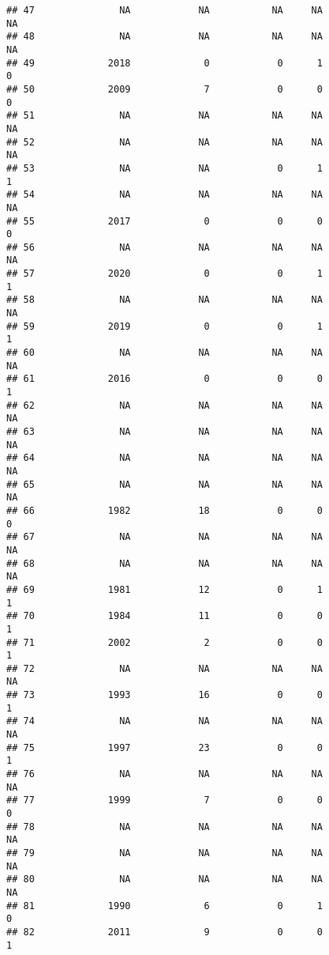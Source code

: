 \documentclass[
  english,
  man]{apa6}
\begin{document}
\begin{verbatim}
## 47               NA            NA           NA     NA              NA
## 48               NA            NA           NA     NA              NA
## 49             2018             0            0      1               0
## 50             2009             7            0      0               0
## 51               NA            NA           NA     NA              NA
## 52               NA            NA           NA     NA              NA
## 53               NA            NA            0      1               1
## 54               NA            NA           NA     NA              NA
## 55             2017             0            0      0               0
## 56               NA            NA           NA     NA              NA
## 57             2020             0            0      1               1
## 58               NA            NA           NA     NA              NA
## 59             2019             0            0      1               1
## 60               NA            NA           NA     NA              NA
## 61             2016             0            0      0               1
## 62               NA            NA           NA     NA              NA
## 63               NA            NA           NA     NA              NA
## 64               NA            NA           NA     NA              NA
## 65               NA            NA           NA     NA              NA
## 66             1982            18            0      0               0
## 67               NA            NA           NA     NA              NA
## 68               NA            NA           NA     NA              NA
## 69             1981            12            0      1               1
## 70             1984            11            0      0               1
## 71             2002             2            0      0               1
## 72               NA            NA           NA     NA              NA
## 73             1993            16            0      0               1
## 74               NA            NA           NA     NA              NA
## 75             1997            23            0      0               1
## 76               NA            NA           NA     NA              NA
## 77             1999             7            0      0               0
## 78               NA            NA           NA     NA              NA
## 79               NA            NA           NA     NA              NA
## 80               NA            NA           NA     NA              NA
## 81             1990             6            0      1               0
## 82             2011             9            0      0               1

\end{verbatim}
\end{document}

